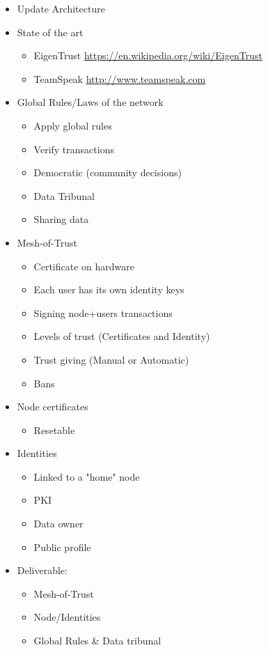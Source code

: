 \begin{itemize}
\item Update Architecture
\item State of the art
\begin{itemize}
    \item EigenTrust \url{https://en.wikipedia.org/wiki/EigenTrust}
    \item TeamSpeak \url{http://www.teamspeak.com}
\end{itemize}
\item Global Rules/Laws of the network
\begin{itemize}
    \item Apply global rules
    \item Verify transactions
    \item Democratic (community decisions)
    \item Data Tribunal
    \item Sharing data
\end{itemize}
\item Mesh-of-Trust
\begin{itemize}
    \item Certificate on hardware
    \item Each user has its own identity keys
    \item Signing node+users transactions
    \item Levels of trust (Certificates and Identity)
    \item Trust giving (Manual or Automatic)
    \item Bans
\end{itemize}
\item Node certificates
\begin{itemize}
    \item Resetable
\end{itemize}
\item Identities
\begin{itemize}
    \item Linked to a "home" node
    \item PKI
    \item Data owner
    \item Public profile
\end{itemize}
\item Deliverable:
\begin{itemize}
    \item Mesh-of-Trust
    \item Node/Identities
    \item Global Rules \& Data tribunal
\end{itemize}
\end{itemize}


